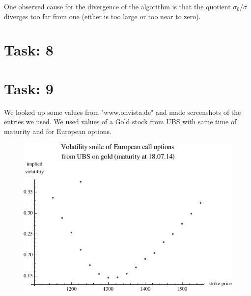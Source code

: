 \documentclass{article}
\begin{document}
One observed cause for the divergence of the algorithm is that the quotient $\sigma_0 / \sigma$ diverges too far from one (either is too large or too near to zero).

\section*{Task: 8}

\section*{Task: 9}
We looked up some values from "{}www.onvista.de"{} and made screenshots of the entries we used. We used values of a Gold stock from UBS with same time of maturity and for European options.
\begin{figure}[htbp]
  \centering
     \includegraphics[width=1.0\textwidth]{../Task09/smileFromExternalData.pdf}
\end{figure}
\end{document}
